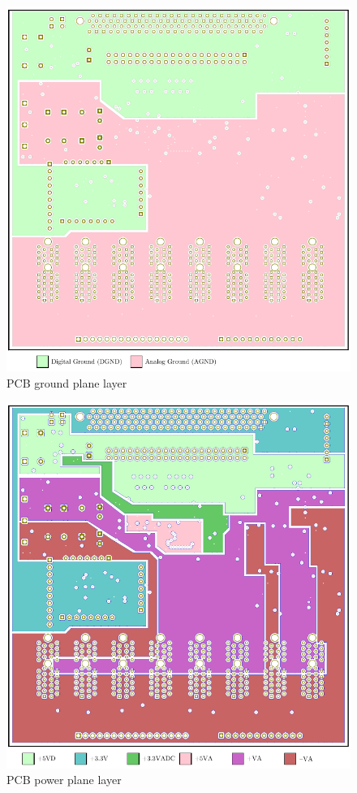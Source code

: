 \begin{figure}[h]
	\begin{singlespace}
	\centering	
		\includegraphics{./figures/PCBCopperGND} 
	\caption{PCB ground plane layer\label{fig:PCBGND}}
	\end{singlespace}
\end{figure}

\begin{figure}[h]
	\begin{singlespace}
	\centering 
		\includegraphics{./figures/PCBCopperPWR} 
	\caption{PCB power plane layer\label{fig:PCBPWR}}
	\end{singlespace}
\end{figure}

